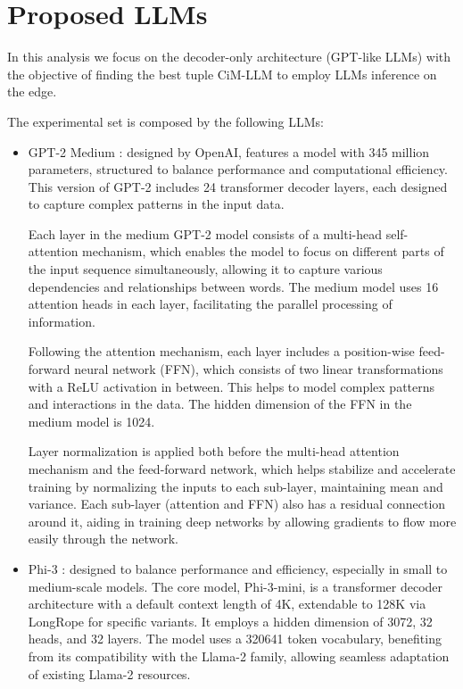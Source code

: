\documentclass[conference]{IEEEtran}
\begin{document}
\section{Proposed LLMs}
In this analysis we focus on the decoder-only architecture (GPT-like LLMs) with the objective of finding the best tuple CiM-LLM to employ LLMs inference on the edge.

The experimental set is composed by the following LLMs:
\begin{itemize}

\item GPT-2 Medium \cite{radford2019language}: designed by OpenAI, features a model with 345 million parameters, structured to balance performance and computational efficiency. This version of GPT-2 includes 24 transformer decoder layers, each designed to capture complex patterns in the input data.

Each layer in the medium GPT-2 model consists of a multi-head self-attention mechanism, which enables the model to focus on different parts of the input sequence simultaneously, allowing it to capture various dependencies and relationships between words. The medium model uses 16 attention heads in each layer, facilitating the parallel processing of information.

Following the attention mechanism, each layer includes a position-wise feed-forward neural network (FFN), which consists of two linear transformations with a ReLU activation in between. This helps to model complex patterns and interactions in the data. The hidden dimension of the FFN in the medium model is 1024.

Layer normalization is applied both before the multi-head attention mechanism and the feed-forward network, which helps stabilize and accelerate training by normalizing the inputs to each sub-layer, maintaining mean and variance. Each sub-layer (attention and FFN) also has a residual connection around it, aiding in training deep networks by allowing gradients to flow more easily through the network.

\item Phi-3 \cite{abdin2024phi}: designed to balance performance and efficiency, especially in small to medium-scale models. The core model, Phi-3-mini, is a transformer decoder architecture with a default context length of 4K, extendable to 128K via LongRope \cite{ding2024longrope} for specific variants. It employs a hidden dimension of 3072, 32 heads, and 32 layers. The model uses a 320641 token vocabulary, benefiting from its compatibility with the Llama-2 family, allowing seamless adaptation of existing Llama-2 resources.


\end{itemize}
\end{document}
